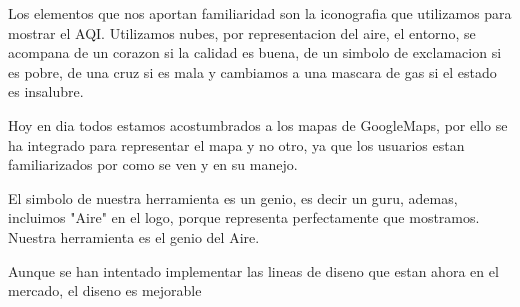 Los elementos que nos aportan familiaridad son la iconografia que utilizamos para mostrar el AQI. Utilizamos nubes, por representacion
del aire, el entorno, se acompana de un corazon si la calidad es buena, de un simbolo de exclamacion si es pobre, de una cruz si es 
mala y cambiamos a una mascara de gas si el estado es insalubre.

Hoy en dia todos estamos acostumbrados a los mapas de GoogleMaps, por ello se ha integrado para representar el mapa y no otro,
ya que los usuarios estan familiarizados por como se ven y en su manejo.

El simbolo de nuestra herramienta es un genio, es decir un guru, ademas, incluimos "Aire" en el logo, porque representa perfectamente
que mostramos. Nuestra herramienta es el genio del Aire.


\begin{itemize}
    \done
    \crossed
    \crossed Aunque se han intentado implementar las lineas de diseno que estan ahora en el mercado, el diseno es mejorable
\end{itemize}

\newpage